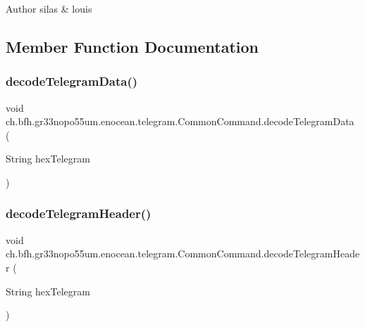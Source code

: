 \begin{DoxyAuthor}{Author}
silas \& louis 
\end{DoxyAuthor}


\subsection{Member Function Documentation}
\hypertarget{classch_1_1bfh_1_1gr33nopo55um_1_1enocean_1_1telegram_1_1_common_command_a416a74c674f10644792359e1a8ac6806}{}\label{classch_1_1bfh_1_1gr33nopo55um_1_1enocean_1_1telegram_1_1_common_command_a416a74c674f10644792359e1a8ac6806} 
\subsubsection{\texorpdfstring{decode\+Telegram\+Data()}{decodeTelegramData()}}
{\footnotesize\ttfamily void ch.\+bfh.\+gr33nopo55um.\+enocean.\+telegram.\+Common\+Command.\+decode\+Telegram\+Data (\begin{DoxyParamCaption}\item[{String}]{hex\+Telegram }\end{DoxyParamCaption})}

\hypertarget{classch_1_1bfh_1_1gr33nopo55um_1_1enocean_1_1telegram_1_1_common_command_ab6665242c2dae33aae44ed241790ada8}{}\label{classch_1_1bfh_1_1gr33nopo55um_1_1enocean_1_1telegram_1_1_common_command_ab6665242c2dae33aae44ed241790ada8} 
\subsubsection{\texorpdfstring{decode\+Telegram\+Header()}{decodeTelegramHeader()}}
{\footnotesize\ttfamily void ch.\+bfh.\+gr33nopo55um.\+enocean.\+telegram.\+Common\+Command.\+decode\+Telegram\+Header (\begin{DoxyParamCaption}\item[{String}]{hex\+Telegram }\end{DoxyParamCaption})}

